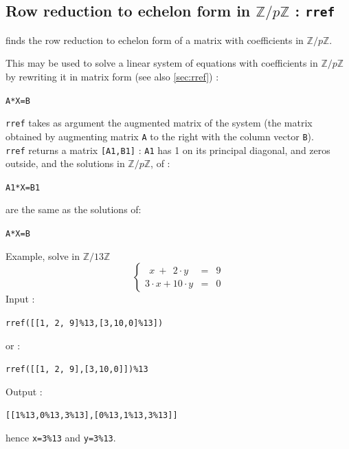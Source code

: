 \documentclass[a4paper,11pt]{book}
\newcommand{\Z}{{\mathbb{Z}}}
\begin{document}
\subsection{Row reduction to echelon form in $\Z/p\Z$ : {\tt rref}}\label{sec:rrefm}
 finds the row reduction to echelon form of
a matrix with coefficients in $\Z/p\Z$. 

This may be used
to solve a linear system of equations with coefficients in  $\Z/p\Z$ 
by rewriting it in matrix form (see also \ref{sec:rref}) :
\begin{center}{\tt A*X=B}\end{center}
{\tt rref} takes as argument the augmented matrix 
of the system (the matrix obtained by augmenting matrix {\tt A} to the 
right with the column vector {\tt B}).\\
{\tt rref} returns a matrix {\tt [A1,B1]} : {\tt A1} has 1 on
its principal diagonal, and zeros outside, and the
solutions in $\Z/p\Z$, of :
\begin{center}{\tt A1*X=B1}\end{center} 
are the same as the solutions of:
\begin{center}{\tt A*X=B}\end{center}
Example, solve in $\Z/13\Z$
$$\left \{\begin{array}{lcr}\ \  x\ +\ \  2 \cdot y & = &9 \\3 \cdot x +10 \cdot y & =& 0 \end{array}\right.$$
Input :
\begin{center}{\tt rref([[1, 2, 9]\%13,[3,10,0]\%13])}\end{center} 
or :
\begin{center}{\tt rref([[1, 2, 9],[3,10,0]])\%13}\end{center} 
Output :
\begin{center}{\tt [[1\%13,0\%13,3\%13],[0\%13,1\%13,3\%13]]}\end{center} 
hence {\tt x=3\%13} and  {\tt y=3\%13}.
\end{document}

